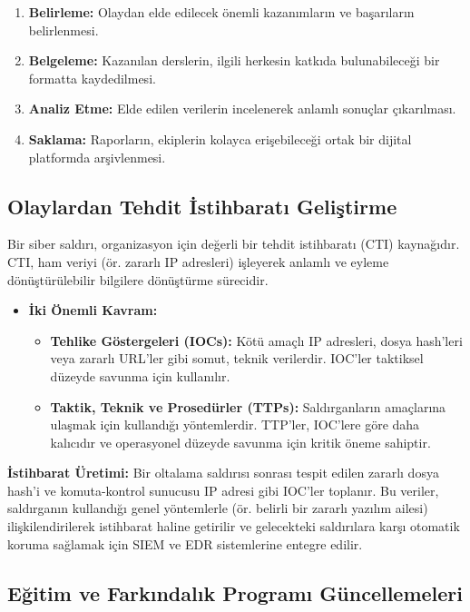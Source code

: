 \begin{itemize}
\begin{enumerate}
    \item \textbf{Belirleme:} Olaydan elde edilecek önemli kazanımların ve başarıların belirlenmesi.
    \item \textbf{Belgeleme:} Kazanılan derslerin, ilgili herkesin katkıda bulunabileceği bir formatta kaydedilmesi.
    \item \textbf{Analiz Etme:} Elde edilen verilerin incelenerek anlamlı sonuçlar çıkarılması.
    \item \textbf{Saklama:} Raporların, ekiplerin kolayca erişebileceği ortak bir dijital platformda arşivlenmesi.
\end{enumerate}

\subsection{Olaylardan Tehdit İstihbaratı Geliştirme}

Bir siber saldırı, organizasyon için değerli bir tehdit istihbaratı (CTI) kaynağıdır. CTI, ham veriyi (ör. zararlı IP adresleri) işleyerek anlamlı ve eyleme dönüştürülebilir bilgilere dönüştürme sürecidir.

\begin{itemize}
    \item \textbf{İki Önemli Kavram:}
    \begin{itemize}
        \item \textbf{Tehlike Göstergeleri (IOCs):} Kötü amaçlı IP adresleri, dosya hash'leri veya zararlı URL'ler gibi somut, teknik verilerdir. IOC'ler taktiksel düzeyde savunma için kullanılır.
        \item \textbf{Taktik, Teknik ve Prosedürler (TTPs):} Saldırganların amaçlarına ulaşmak için kullandığı yöntemlerdir. TTP'ler, IOC'lere göre daha kalıcıdır ve operasyonel düzeyde savunma için kritik öneme sahiptir.
    \end{itemize}
\end{itemize}
\textbf{İstihbarat Üretimi:}
Bir oltalama saldırısı sonrası tespit edilen zararlı dosya hash'i ve komuta-kontrol sunucusu IP adresi gibi IOC'ler toplanır. Bu veriler, saldırganın kullandığı genel yöntemlerle (ör. belirli bir zararlı yazılım ailesi) ilişkilendirilerek istihbarat haline getirilir ve gelecekteki saldırılara karşı otomatik koruma sağlamak için SIEM ve EDR sistemlerine entegre edilir.

\subsection{Eğitim ve Farkındalık Programı Güncellemeleri}


\end{itemize}
